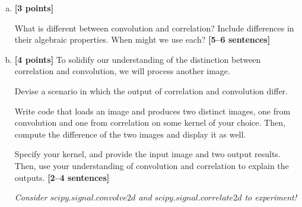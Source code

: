\documentclass[11pt]{article}
\begin{document}
\begin{enumerate}[(a)]

    \item \textbf{[3 points]} 
    \begin{tcolorbox}[colback=orange!5!white,colframe=orange!75!black]
    What is different between convolution and correlation? Include differences in their algebraic properties. When might we use each? \textbf{[5--6 sentences]}
    \end{tcolorbox}
    
    
    \item \textbf{[4 points]}
    To solidify our understanding of the distinction between correlation and convolution, we will process another image.
    
    \begin{tcolorbox}[colback=orange!5!white,colframe=orange!75!black]
    Devise a scenario in which the output of correlation and convolution differ.
    
    Write code that loads an image and produces two distinct images, one from convolution and one from correlation on some kernel of your choice. Then, compute the difference of the two images and display it as well.
    
    Specify your kernel, and provide the input image and two output results. Then, use your understanding of convolution and correlation to explain the outputs. \textbf{[2--4 sentences]}
    \end{tcolorbox}
    
    \emph{Consider \href{https://docs.scipy.org/doc/scipy/reference/generated/scipy.signal.convolve2d.html}{$scipy.signal.convolve2d$} and \href{https://docs.scipy.org/doc/scipy/reference/generated/scipy.signal.correlate2d.html}{$scipy.signal.correlate2d$} to experiment!}
    


\end{enumerate}
\end{document}
